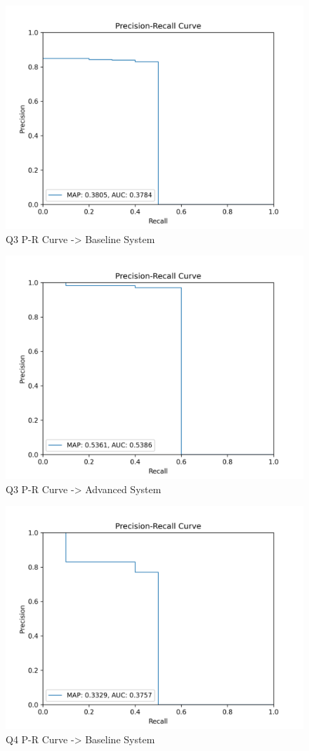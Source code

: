 \documentclass[sigconf]{acmart}
\begin{document}
\begin{figure}[H]
  \centering
  \includegraphics[width=0.8\linewidth]{precision_recall_q3b.png}
  \caption{Q3 P-R Curve -> Baseline System}
  \label{fig:precisionRecallBaseline3}
\end{figure}

\begin{figure}[H]
  \centering
  \includegraphics[width=0.8\linewidth]{precision_recall_q3a.png}
  \caption{Q3 P-R Curve -> Advanced System}
  \label{fig:precisionRecallAdvanced3}
\end{figure}

\begin{figure}[H]
  \centering
  \includegraphics[width=0.8\linewidth]{precision_recall_q4b.png}
  \caption{Q4 P-R Curve -> Baseline System}
  \label{fig:precisionRecallBaseline4}
\end{figure}
\end{document}

